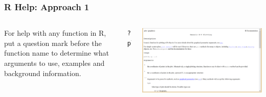 \begin{frame}[fragile]
\frametitle{R Help: Approach 1}

  \begin{columns}
  For help with any function in R, put a question mark before the function name to determine what arguments to use, examples and background information.

  \begin{lstlisting}
?plot
  \end{lstlisting}

    \begin{center}
    \includegraphics[width=1.1\textwidth]{images/Rhelp}
    \end{center}
  \end{columns}

\end{frame}

